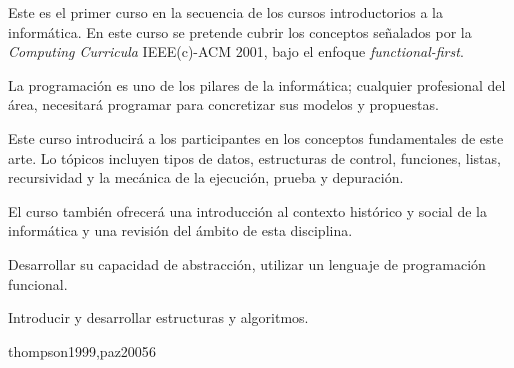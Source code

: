 \begin{syllabus}


\begin{justification}
Este es el primer curso en la secuencia de los cursos introductorios a la informática. En este curso se pretende cubrir los conceptos señalados por la \textit{Computing Curricula} IEEE(c)-ACM 2001, bajo el enfoque \textit{functional-first}.

La programación es uno de los pilares de la informática; cualquier profesional del área, necesitará programar para concretizar sus modelos y propuestas.

Este curso introducirá a los participantes en los conceptos fundamentales de este arte. Lo tópicos incluyen tipos de datos, estructuras de control, funciones, listas, recursividad y la mecánica de la ejecución, prueba y depuración. 

El curso también ofrecerá una introducción al contexto histórico y social de la informática y una revisión del ámbito de esta disciplina.
\end{justification}

\begin{goals}
\item Desarrollar su capacidad de abstracción, utilizar un lenguaje de programación funcional.
\item Introducir y desarrollar estructuras y algoritmos.
\end{goals}

\begin{outcomes}
\end{outcomes}

\begin{unit}{\SPONEDef}{thompson1999,paz2005}{6}
   \begin{topics}
      \item \SPONETopicHistoria
      \item \SPONETopicPioneros
   \end{topics}

   \begin{learningoutcomes}
      \item \SPONEObjONE
      \item \SPONEObjTWO
      \item \SPONEObjTHREE
   \end{learningoutcomes}
\end{unit}


\end{syllabus}
